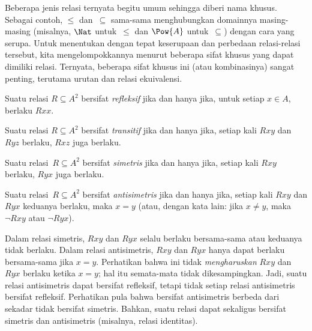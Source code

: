 \documentclass[../../../include/open-logic-section]{subfiles}
\begin{document}

\begin{intro}
Beberapa jenis relasi ternyata begitu umum sehingga diberi nama khusus.
Sebagai contoh, $\le$ dan~$\subseteq$ sama-sama menghubungkan domainnya
masing-masing (misalnya, $\Nat$ untuk~$\le$ dan $\Pow{A}$
untuk~$\subseteq$) dengan cara yang serupa. Untuk menentukan dengan tepat
keserupaan dan perbedaan relasi-relasi tersebut, kita mengelompokkannya
menurut beberapa sifat khusus yang dapat dimiliki relasi. Ternyata, beberapa
sifat khusus ini (atau kombinasinya) sangat penting, terutama urutan dan
relasi ekuivalensi.
\end{intro}

\begin{defn}[Refleksivitas]
Suatu relasi $R \subseteq A^2$ bersifat \emph{refleksif} jika dan hanya jika,
untuk setiap $x \in A$, berlaku $Rxx$.
\end{defn}

\begin{defn}[Transitivitas]
Suatu relasi $R \subseteq A^2$ bersifat \emph{transitif} jika dan hanya jika,
setiap kali $Rxy$ dan $Ryz$ berlaku, $Rxz$ juga berlaku.
\end{defn}

\begin{defn}[Simetri]
Suatu relasi~$R \subseteq A^2$ bersifat \emph{simetris} jika dan hanya jika,
setiap kali $Rxy$ berlaku, $Ryx$ juga berlaku.
\end{defn}

\begin{defn}[Antisimetri]
Suatu relasi~$R \subseteq A^2$ bersifat \emph{anti\-si\-metris} jika dan hanya
jika, setiap kali $Rxy$ dan $Ryx$ keduanya berlaku, maka $x=y$ (atau, dengan
kata lain: jika $x\neq y$, maka $\lnot Rxy$ atau $\lnot Ryx$).
\end{defn}

\begin{explain}
Dalam relasi simetris, $Rxy$ dan $Ryx$ selalu berlaku bersama-sama atau
keduanya tidak berlaku. Dalam relasi antisimetris, $Rxy$ dan $Ryx$ hanya dapat
berlaku bersama-sama jika $x = y$. Perhatikan bahwa ini tidak
\emph{mengharuskan} $Rxy$ dan $Ryx$ berlaku ketika $x = y$; hal itu semata-mata
tidak dikesampingkan. Jadi, suatu relasi antisimetris dapat bersifat
refleksif, tetapi tidak setiap relasi antisimetris bersifat refleksif.
Perhatikan pula bahwa bersifat antisimetris berbeda dari sekadar tidak
bersifat simetris. Bahkan, suatu relasi dapat sekaligus bersifat simetris dan
antisimetris (misalnya, relasi identitas).
\end{explain}
\end{document}
